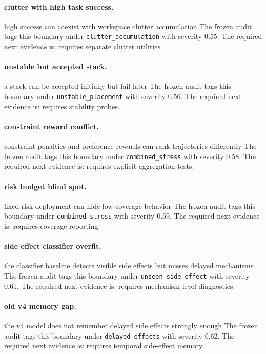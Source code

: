 \documentclass{article}
\begin{document}
\paragraph{clutter with high task success.} high success can coexist with workspace clutter accumulation The frozen audit tags this boundary under \texttt{clutter\_accumulation} with severity 0.55. The required next evidence is: requires separate clutter utilities.

\paragraph{unstable but accepted stack.} a stack can be accepted initially but fail later The frozen audit tags this boundary under \texttt{unstable\_placement} with severity 0.56. The required next evidence is: requires stability probes.

\paragraph{constraint reward conflict.} constraint penalties and preference rewards can rank trajectories differently The frozen audit tags this boundary under \texttt{combined\_stress} with severity 0.58. The required next evidence is: requires explicit aggregation tests.

\paragraph{risk budget blind spot.} fixed-risk deployment can hide low-coverage behavior The frozen audit tags this boundary under \texttt{combined\_stress} with severity 0.59. The required next evidence is: requires coverage reporting.

\paragraph{side effect classifier overfit.} the classifier baseline detects visible side effects but misses delayed mechanisms The frozen audit tags this boundary under \texttt{unseen\_side\_effect} with severity 0.61. The required next evidence is: requires mechanism-level diagnostics.

\paragraph{old v4 memory gap.} the v4 model does not remember delayed side effects strongly enough The frozen audit tags this boundary under \texttt{delayed\_effects} with severity 0.62. The required next evidence is: requires temporal side-effect memory.
\end{document}
